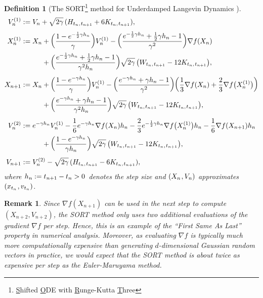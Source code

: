 \documentclass[sn-mathphys-num]{sn-jnl}%
\newtheorem{remark}{Remark}%
\newtheorem{definition}{Definition}%
\newcommand{\m}{\hspace{0.25mm}}
\begin{document}
\begin{definition}[The SORT\footnote{\underline{S}hifted \underline{O}DE with \underline{R}unge-Kutta \underline{T}hree} method for Underdamped Langevin Dynamics {\cite{foster2024splitting, foster2021uld}}]\label{def:sort}
\begin{align*}
V_n^{(1)} & := V_n + \sqrt{2\gamma }\,(H_{t_n,\m t_{n+1}} + 6K_{t_n,\m t_{n+1}}),\\[3pt]
X_n^{(1)} & := X_n + \bigg(\frac{1-e^{-\frac{1}{2}\gamma h_n}}{\gamma}\bigg)V_n^{(1)} - \bigg(\frac{e^{-\frac{1}{2}\gamma h_n} + \frac{1}{2}\gamma h_n - 1}{\gamma^2}\bigg)\nabla f(X_n)\\
&\hspace{10.5mm} + \bigg(\frac{e^{-\frac{1}{2}\gamma h_n} + \frac{1}{2}\gamma h_n - 1}{\gamma^2 h_n}\bigg)\sqrt{2\gamma}\,\big(W_{t_n,\m t_{n+1}} - 12 K_{t_n,\m t_{n+1}}\big),\\[3pt]
X_{n+1} & := X_n + \bigg(\frac{1-e^{-\gamma h_n}}{\gamma}\bigg)V_n^{(1)} - \bigg(\frac{e^{-\gamma h_n} + \gamma h_n - 1}{\gamma^2}\bigg)\bigg(\frac{1}{3}\nabla f(X_n) + \frac{2}{3}\nabla f\big(X_n^{(1)}\big)\bigg)\\
&\hspace{10.5mm} + \bigg(\frac{e^{-\gamma h_n} + \gamma h_n - 1}{\gamma^2 h_n}\bigg)\sqrt{2\gamma}\,\big(W_{t_n,\m t_{n+1}} - 12 K_{t_n,\m t_{n+1}}\big),\\[3pt]
V_n^{(2)} & := e^{-\gamma h_n} V_n^{(1)} - \frac{1}{6}e^{-\gamma h_n} \nabla f(X_n) h_n - \frac{2}{3}e^{-\frac{1}{2}\gamma h_n} \nabla f\big(X_n^{(1)}\big) h_n - \frac{1}{6}\nabla f(X_{n+1})h_n\\
&\hspace{10.5mm} + \bigg(\frac{1 - e^{-\gamma h_n}}{\gamma h_n} \bigg)\sqrt{2\gamma}\,\big(W_{t_n,\m t_{n+1}} - 12 K_{t_n,\m t_{n+1}}\big),\\[3pt]
V_{n+1} & := V_n^{(2)} - \sqrt{2\gamma}\,(H_{t_n,\m t_{n+1}} - 6K_{t_n,\m t_{n+1}}),
\end{align*}
where $h_n := t_{n+1} - t_n > 0\m$ denotes the step size and $(X_n\m, V_n)$ approximates $(x_{t_n}\m, v_{t_n})$.
\end{definition}

\begin{remark}
Since $\nabla f(X_{n+1})$ can be used in the next step to compute $(X_{n+2}, V_{n+2})$, the SORT method only uses two additional evaluations of the gradient $\nabla f$ per step.
Hence, this is an example of the ``First Same As Last'' property in numerical analysis.
Moreover, as evaluating $\nabla f$ is typically much more computationally expensive than generating $d$-dimensional Gaussian random vectors in practice, we would expect that the SORT method is about twice as expensive per step as the Euler-Maruyama method.
\end{remark}\medbreak
\end{document}
